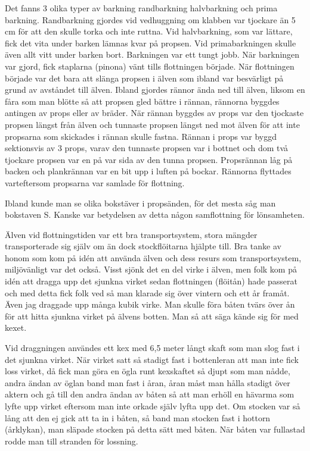 Det fanns 3 olika typer av barkning randbarkning halvbarkning och prima barkning. Randbarkning gjordes vid vedhuggning om klabben var tjockare än 5 cm för att den skulle torka och inte ruttna. Vid halvbarkning, som var lättare, fick det vita under barken lämnas kvar på propsen. Vid primabarkningen skulle även allt vitt under barken bort. Barkningen var ett tungt jobb. När barkningen var gjord, fick staplarna (pinona) vänt tills flottningen började. När flottningen började var det bara att slänga propsen i älven som ibland var besvärligt på grund av avståndet till älven. Ibland gjordes rännor ända ned till älven, liksom en fåra som man blötte så att propsen gled bättre i rännan, rännorna byggdes antingen av props eller av bräder. När rännan byggdes av props var den tjockaste propsen längst från älven och tunnaste propsen längst ned mot älven för att inte propsarna som skickades i rännan skulle fastna. Rännan i props var byggd sektionsvis av 3 props, varav den tunnaste propsen var i bottnet och dom två tjockare propsen var en på var sida av den tunna propsen. Propsrännan låg på backen och plankrännan var en bit upp i luften på bockar. Rännorna flyttades varteftersom propsarna var samlade för flottning.

Ibland kunde man se olika bokstäver i propsänden, för det mesta såg man bokstaven S. Kanske var betydelsen av detta någon samflottning för lönsamheten.

Älven vid flottningstiden var ett bra transportsystem, stora mängder transporterade sig själv om än dock stockflöitarna hjälpte till. Bra tanke av honom som kom på idén att använda älven och dess resurs som transportsystem, miljövänligt var det också. Visst sjönk det en del virke i älven, men folk kom på idén att dragga upp det sjunkna virket sedan flottningen (flöitån) hade passerat och med detta fick folk ved så man klarade sig över vintern och ett år framåt. Även jag draggade upp många kubik virke. Man skulle föra båten tvärs över ån för att hitta sjunkna virket på älvens botten. Man så att säga kände sig för med kexet.

Vid draggningen användes ett kex med 6,5 meter långt skaft som man slog fast i det sjunkna virket. När virket satt så stadigt fast i bottenleran att man inte fick loss virket, då fick man göra en ögla runt kexskaftet så djupt som man nådde, andra ändan av öglan band man fast i åran, åran måst man hålla stadigt över aktern och gå till den andra ändan av båten så att man erhöll en hävarma som lyfte upp virket eftersom man inte orkade själv lyfta upp det. Om stocken var så lång att den ej gick att ta in i båten, så band man stocken fast i hottorn (årklykan), man släpade stocken på detta sätt med båten. När båten var fullastad rodde man till stranden för lossning.


